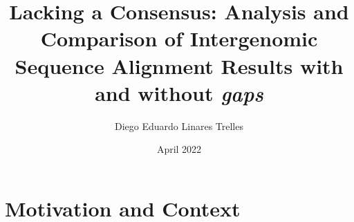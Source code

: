 \documentclass[]{report}
\title{Lacking a Consensus: Analysis and Comparison of Intergenomic Sequence Alignment Results with and without \textit{gaps}}
\author{Diego Eduardo Linares Trelles}
\date{April 2022}
\begin{document}
  \maketitle
  

  \tableofcontents

  \chapter{Motivation and Context}
  
  
  
  

  
  \clearpage
  
\end{document}
